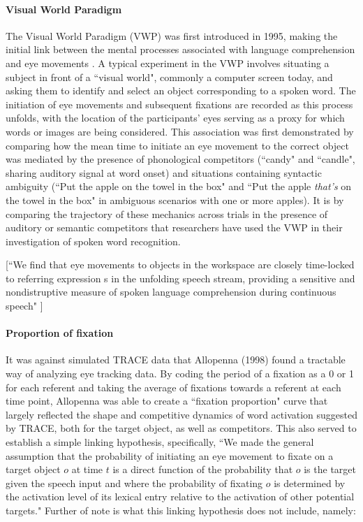 \paragraph{Visual World Paradigm} The Visual World Paradigm (VWP) was first introduced in 1995, making the initial link between the mental processes associated with language comprehension and eye movements \cite{tanenhaus1995integration}. A typical experiment in the VWP involves situating a subject in front of a ``visual world", commonly a computer screen today, and asking them to identify and select an object corresponding to a spoken word. The initiation of eye movements and subsequent fixations are recorded as this process unfolds, with the location of the participants' eyes serving as a proxy for which words or images are being considered. This association was first demonstrated by comparing how the mean time to initiate an eye movement to the correct object was mediated by the presence of phonological competitors (``candy" and ``candle", sharing auditory signal at word onset) and situations containing syntactic ambiguity (``Put the apple on the towel in the box" and ``Put the apple \textit{that's} on the towel in the box" in ambiguous scenarios with one or more apples). It is by comparing the trajectory of these mechanics across trials in the presence of auditory or semantic competitors that researchers have used the VWP in their investigation of spoken word recognition.

[``We find that eye movements to objects in the workspace are closely time-locked to referring expression s in the unfolding speech stream, providing a sensitive and nondistruptive measure of spoken language comprehension during continuous speech" \cite{allopenna1998tracking}]


\paragraph{Proportion of fixation} It was against simulated TRACE data that Allopenna (1998) found a tractable way of analyzing eye tracking data. By coding the period of a fixation as a 0 or 1 for each referent and taking the average of fixations towards a referent at each time point, Allopenna was able to create a ``fixation proportion" curve that largely reflected the shape and competitive dynamics of word activation suggested by TRACE, both for the target object, as well as competitors. This also served to establish a simple linking hypothesis, specifically, ``We made the general assumption that the probability of initiating an eye movement to fixate on a target object $o$ at time $t$ is a direct function of the probability that $o$ is the target given the speech input and where the probability of fixating $o$ is determined by the activation level of its lexical entry relative to the activation of other potential targets." Further of note is what this linking hypothesis does not include, namely:

